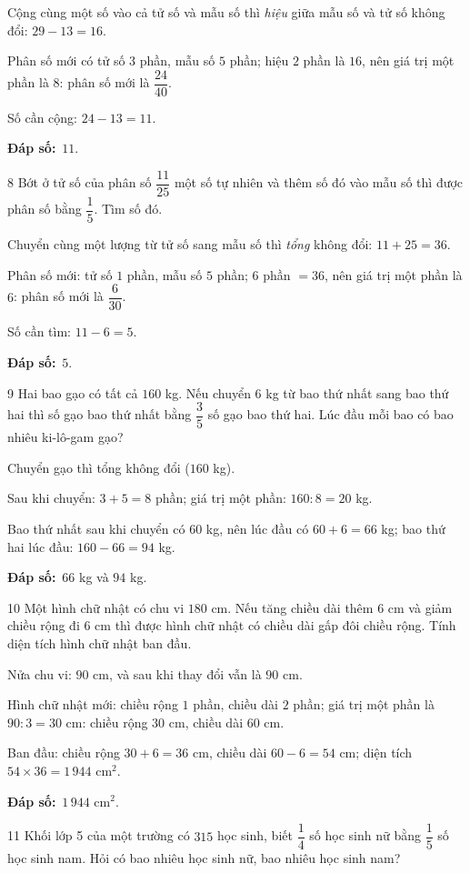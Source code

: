 \documentclass[11pt]{article}
\newif\ifsol \solfalse
\providecommand{\AnsWord}{Đáp số}
\newcommand{\dapso}[1]{\par\textbf{\AnsWord:}\ #1}
\newcommand{\probsol}[1]{%
  \begin{lrbox}{\solmeasure}\begin{minipage}{\dimexpr\linewidth-24pt\relax}#1\end{minipage}\end{lrbox}%
  \ifsol
    \begin{solbox}#1\end{solbox}%
  \else
    \setlength{\solht}{\dimexpr\ht\solmeasure+\dp\solmeasure+0.85cm\relax}%
    \ifdim\solht<1.35cm\setlength{\solht}{1.35cm}\fi
    \begin{tcolorbox}[colback=white,colframe=Line,boxrule=0.8pt,arc=5pt,
      left=8pt,right=8pt,top=4pt,bottom=4pt,height=\solht]{\footnotesize\color{Slate}\itshape\WorkWord}\end{tcolorbox}%
  \fi}
\newcommand{\gap}{\vspace{0.3cm}}
\def\WorkWord{Bài làm:}
\def\AnsWord{Đáp số}
\begin{document}
\probsol{
Cộng cùng một số vào cả tử số và mẫu số thì \emph{hiệu} giữa mẫu số và tử số không đổi: $29-13=16$.\par
Phân số mới có tử số $3$ phần, mẫu số $5$ phần; hiệu $2$ phần là $16$, nên giá trị một phần là $8$: phân số mới là $\dfrac{24}{40}$.\par
Số cần cộng: $24-13=11$.
\dapso{$11$.}}
\gap
\begin{probbox}{8}{\relax}
Bớt ở tử số của phân số $\dfrac{11}{25}$ một số tự nhiên và thêm số đó vào mẫu số thì được phân số bằng $\dfrac15$. Tìm số đó.
\end{probbox}
\probsol{
Chuyển cùng một lượng từ tử số sang mẫu số thì \emph{tổng} không đổi: $11+25=36$.\par
Phân số mới: tử số $1$ phần, mẫu số $5$ phần; $6$ phần $=36$, nên giá trị một phần là $6$: phân số mới là $\dfrac6{30}$.\par
Số cần tìm: $11-6=5$.
\dapso{$5$.}}
\gap
\begin{probbox}{9}{\relax}
Hai bao gạo có tất cả $160$ kg. Nếu chuyển $6$ kg từ bao thứ nhất sang bao thứ hai thì số gạo bao thứ nhất bằng $\dfrac35$ số gạo bao thứ hai. Lúc đầu mỗi bao có bao nhiêu ki-lô-gam gạo?
\end{probbox}
\probsol{
Chuyển gạo thì tổng không đổi ($160$ kg).\par Sau khi chuyển: $3+5=8$ phần; giá trị một phần: $160:8=20$ kg.\par
Bao thứ nhất sau khi chuyển có $60$ kg, nên lúc đầu có $60+6=66$ kg; bao thứ hai lúc đầu: $160-66=94$ kg.
\dapso{$66$ kg và $94$ kg.}}
\gap
\begin{probbox}{10}{\relax}
Một hình chữ nhật có chu vi $180$ cm. Nếu tăng chiều dài thêm $6$ cm và giảm chiều rộng đi $6$ cm thì được hình chữ nhật có chiều dài gấp đôi chiều rộng. Tính diện tích hình chữ nhật ban đầu.
\end{probbox}
\probsol{
Nửa chu vi: $90$ cm, và sau khi thay đổi vẫn là $90$ cm.\par
Hình chữ nhật mới: chiều rộng $1$ phần, chiều dài $2$ phần; giá trị một phần là $90:3=30$ cm: chiều rộng $30$ cm, chiều dài $60$ cm.\par
Ban đầu: chiều rộng $30+6=36$ cm, chiều dài $60-6=54$ cm; diện tích $54\times36=1\,944$ cm$^2$.
\dapso{$1\,944$ cm$^2$.}}
\gap
\begin{probbox}{11}{\relax}
Khối lớp 5 của một trường có $315$ học sinh, biết $\dfrac14$ số học sinh nữ bằng $\dfrac15$ số học sinh nam. Hỏi có bao nhiêu học sinh nữ, bao nhiêu học sinh nam?
\end{probbox}
\end{document}
